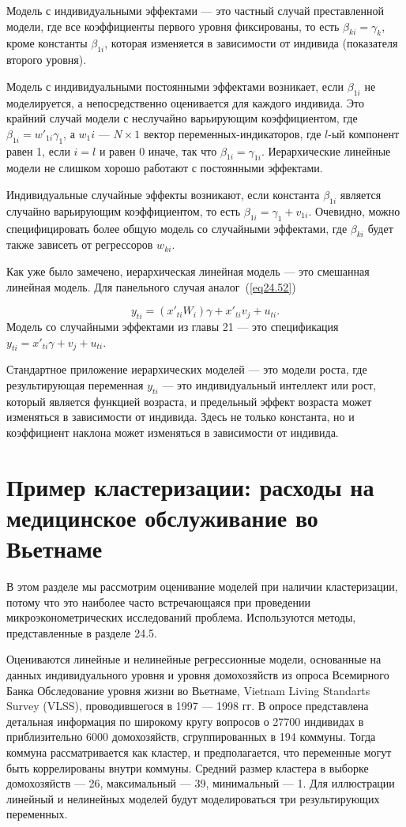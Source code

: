 Модель с индивидуальными эффектами --- это частный случай преставленной модели, где все коэффициенты первого уровня фиксированы, то есть $\beta_{ki} = \gamma_k$, кроме константы $\beta_{1i}$, которая изменяется в зависимости от индивида (показателя второго уровня). 

Модель с индивидуальными постоянными эффектами возникает, если $\beta_{1i}$ не моделируется, а непосредственно оценивается для каждого индивида. Это крайний случай модели с неслучайно варьирующим коэффициентом, где $\beta_{1i} = w'_{1i} \gamma_1$, а $w_1i$ --- $N \times 1$ вектор переменных-индикаторов, где $l$-ый компонент равен 1, если $i=l$ и равен 0 иначе, так что $\beta_{1i} = \gamma_{1i}$. Иерархические линейные модели не слишком хорошо работают с постоянными эффектами. 

Индивидуальные случайные эффекты возникают, если константа $\beta_{1i}$ является случайно варьирующим коэффициентом, то есть $\beta_{1i} = \gamma_1 + v_{1i}$. Очевидно, можно специфицировать более общую модель со случайными эффектами, где $\beta_{ki}$ будет также зависеть от регрессоров $w_{ki}$. 

Как уже было замечено, иерархическая линейная модель --- это смешанная линейная модель. Для панельного случая аналог~(\ref{eq24.52})

$$
y_{ti} = (x'_{ti} W_i) \gamma + x'_{ti} v_j + u_{ti}. 
$$
Модель со случайными эффектами из главы 21 --- это спецификация $y_{ti} = x'_{ti} \gamma + v_j + u_{ti}$.

Стандартное приложение иерархических моделей --- это модели роста, где результирующая переменная $y_{ti}$ --- это индивидуальный интеллект или рост, который является функцией возраста, и предельный эффект возраста может изменяться в зависимости от индивида. Здесь не только константа, но и коэффициент наклона может изменяться в зависимости от индивида. 

\section{Пример кластеризации: расходы на медицинское обслуживание во Вьетнаме}

В этом разделе мы рассмотрим оценивание моделей при наличии кластеризации, потому что это наиболее часто встречающаяся при проведении микроэконометрических исследований проблема. Используются методы, представленные в разделе 24.5. 

Оцениваются линейные и нелинейные регрессионные модели, основанные на данных индивидуального уровня и уровня домохозяйств из опроса Всемирного Банка Обследование уровня жизни во Вьетнаме, Vietnam Living Standarts Survey (VLSS), проводившегося в 1997 --- 1998 гг. В опросе представлена детальная информация по широкому кругу вопросов о 27700 индивидах в приблизительно 6000 домохозяйств, сгруппированных в 194 коммуны. Тогда коммуна рассматривается как кластер, и предполагается, что переменные могут быть коррелированы внутри коммуны. Средний размер кластера в выборке домохозяйств --- 26, максимальный --- 39, минимальный --- 1. Для иллюстрации линейный и нелинейных моделей будут моделироваться три результирующих переменных. 

